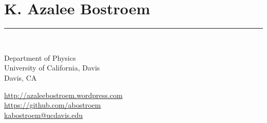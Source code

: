 \documentclass{res}
\begin{document}
 

\section{{\LARGE \bf{K. Azalee Bostroem}}}
{\rule{\linewidth}{0.5mm}} \\
\begin{minipage}{0.55\textwidth}
\vspace{0.25cm}
Department of Physics \\
University of California, Davis \\
Davis, CA
\end{minipage}
\begin{minipage}{0.45\textwidth}
\color{blue}\url{http://azaleebostroem.wordpress.com}\\
\color{blue}\url{https://github.com/abostroem} \\
\color{blue}\url{kabostroem@ucdavis.edu}
\end{minipage} \\
\end{document}
